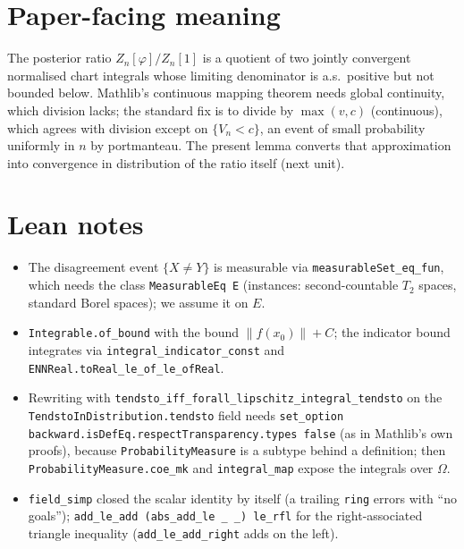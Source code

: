 \documentclass[11pt]{article}
\begin{document}
\section{Paper-facing meaning}
The posterior ratio $Z_n[\varphi]/Z_n[1]$ is a quotient of two jointly convergent normalised chart
integrals whose limiting denominator is a.s.\ positive but not bounded below. Mathlib's continuous
mapping theorem needs global continuity, which division lacks; the standard fix is to divide by
$\max(v,c)$ (continuous), which agrees with division except on $\{V_n<c\}$, an event of small
probability uniformly in $n$ by portmanteau. The present lemma converts that approximation into
convergence in distribution of the ratio itself (next unit).

\section{Lean notes}
\begin{itemize}
\item The disagreement event $\{X\ne Y\}$ is measurable via \texttt{measurableSet\_eq\_fun}, which
needs the class \texttt{MeasurableEq E} (instances: second-countable $T_2$ spaces, standard Borel
spaces); we assume it on $E$.
\item \texttt{Integrable.of\_bound} with the bound $\|f(x_0)\|+C$; the indicator bound integrates via
\texttt{integral\_indicator\_const} and \texttt{ENNReal.toReal\_le\_of\_le\_ofReal}.
\item Rewriting with \texttt{tendsto\_iff\_forall\_lipschitz\_integral\_tendsto} on the
\texttt{TendstoInDistribution.tendsto} field needs
\texttt{set\_option backward.isDefEq.respectTransparency.types false} (as in Mathlib's own proofs),
because \texttt{ProbabilityMeasure} is a subtype behind a definition; then
\texttt{ProbabilityMeasure.coe\_mk} and \texttt{integral\_map} expose the integrals over $\Omega$.
\item \texttt{field\_simp} closed the scalar identity by itself (a trailing \texttt{ring} errors with
``no goals''); \texttt{add\_le\_add (abs\_add\_le \_ \_) le\_rfl} for the right-associated triangle
inequality (\texttt{add\_le\_add\_right} adds on the left).
\end{itemize}
\end{document}
